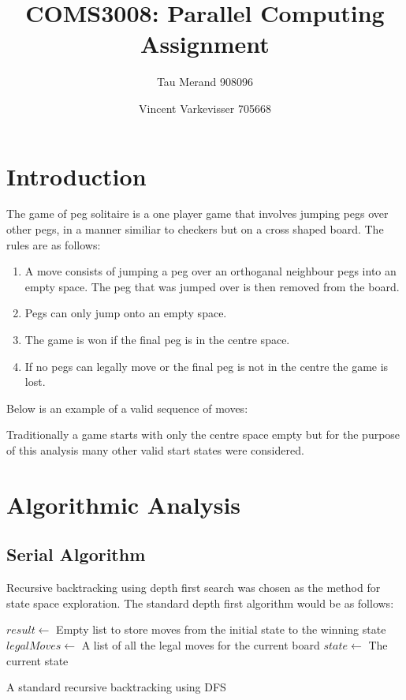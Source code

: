 \documentclass[12pt,a4paper]{report}
\begin{document}
\parindent0pt

\title{COMS3008: Parallel Computing Assignment}
\author{Tau Merand 908096 \and Vincent Varkevisser 705668}
\maketitle
\section*{Introduction}
The game of peg solitaire is a one player game that involves jumping pegs over other pegs, in a manner similiar to checkers but on a cross shaped board. The rules are as follows:
\begin{enumerate}
  \item A move consists of jumping a peg over an orthoganal neighbour pegs into an empty space. The peg that was jumped over is then removed from the board.
  \item Pegs can only jump onto an empty space.
  \item The game is won if the final peg is in the centre space.
  \item If no pegs can legally move or the final peg is not in the centre the game is lost.
\end{enumerate}
Below is an example of a valid sequence of moves:

Traditionally a game starts with only the centre space empty but for the purpose of this analysis many other valid start states were considered.
\section*{Algorithmic Analysis}
\subsection*{Serial Algorithm}
Recursive backtracking using depth first search was chosen as the method for state space exploration. The standard depth first algorithm would be as follows:
\begin{algorithm}[]

  \BlankLine
  $result\leftarrow$ Empty list to store moves from the initial state to the winning state
  $legalMoves\leftarrow$ A list of all the legal moves for the current board\;
  $state\leftarrow$ The current state\;
 \caption{A standard recursive backtracking using DFS}
\end{algorithm}
\end{document}
